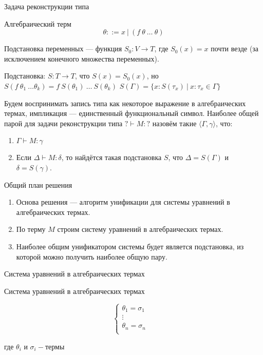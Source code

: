 \documentclass[aspectratio=169]{beamer}
\begin{document}
\begin{frame}{Задача реконструкции типа}
\begin{dfn}Алгебраический терм $$\theta ::= x\:|\:(f\:\theta\:\ldots\:\theta)$$\end{dfn}\vspace{-0.3cm}
\begin{dfn}Подстановка переменных --- функция $S_0: V \rightarrow T$, где $S_0(x) = x$ почти везде
(за исключением конечного множества переменных).

Подстановка: $S: T \rightarrow T$, что $S(x) = S_0(x)$, но $S(f\ \theta_1\ \dots \theta_k) = f\ S(\theta_1)\ \dots\ S(\theta_k)$
$S(\Gamma) = \{ x : S(\tau_x)\ |\ x : \tau_x \in \Gamma\}$
\end{dfn}

\begin{dfn}Будем воспринимать запись типа как некоторое выражение в алгебраических термах, импликация --- единственный
функциональный символ.
Наиболее общей парой для задачи реконструкции типа $?\vdash M:?$ назовём такие $\langle \Gamma, \gamma \rangle$, что:
\begin{enumerate}
\item $\Gamma\vdash M:\gamma$
\item Если $\Delta\vdash M:\delta$, то найдётся такая подстановка $S$, что $\Delta = S(\Gamma)$ и $\delta = S(\gamma)$.
\end{enumerate}
\end{dfn}

\end{frame}

\begin{frame}{Общий план решения}
\begin{enumerate}
\item Основа решения --- алгоритм унификации для системы уравнений в алгебраических термах.
\item По терму $M$ строим систему уравнений в алгебраических термах.
\item Наиболее общим унификатором системы будет является подстановка, из которой можно получить наиболее общую пару.
\end{enumerate}
\end{frame}

\begin{frame}{Система уравнений в алгебраических термах}
	\begin{dfn}Система уравнений в алгебраических термах\end{dfn}
	$$
		\begin{cases}
			\theta_1=\sigma_1&\\
			\vdots&\\
			\theta_n=\sigma_n&\\
		\end{cases}
	$$\par где $\theta_i \text{ и } \sigma_i-\text{термы}$\par
\end{frame}
\end{document}
